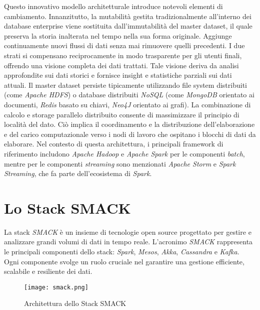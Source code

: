 Questo innovativo modello architetturale introduce notevoli elementi di cambiamento.
Innanzitutto, la mutabilità gestita tradizionalmente all'interno dei database enterprise viene sostituita dall'immutabilità del master dataset, il quale preserva la storia inalterata nel tempo nella sua forma originale.
Aggiunge continuamente nuovi flussi di dati senza mai rimuovere quelli precedenti.
I due strati si compensano reciprocamente in modo trasparente per gli utenti finali, offrendo una visione completa dei dati trattati.
Tale visione deriva da analisi approfondite sui dati storici e fornisce insight e statistiche parziali sui dati attuali.
Il master dataset persiste tipicamente utilizzando file system distribuiti (come \textit{Apache HDFS}) o database distribuiti \textit{NoSQL} (come \textit{MongoDB} orientato ai documenti, \textit{Redis} basato su chiavi, \textit{Neo4J} orientato ai grafi).
La combinazione di calcolo e storage parallelo distribuito consente di massimizzare il principio di località del dato.
Ciò implica il coordinamento e la distribuzione dell'elaborazione e del carico computazionale verso i nodi di lavoro che ospitano i blocchi di dati da elaborare.
Nel contesto di questa architettura, i principali framework di riferimento includono \textit{Apache Hadoop} \cite{hadoop} e \textit{Apache Spark} \cite{spark} per le componenti \textit{batch}, mentre per le componenti \textit{streaming} sono menzionati \textit{Apache Storm} e \textit{Spark Streaming}, che fa parte dell'ecosistema di \textit{Spark}.

\section[Stack SMACK]{Lo Stack SMACK}
La stack \textit{SMACK} è un insieme di tecnologie open source progettato per gestire e analizzare grandi volumi di dati in tempo reale.
L'acronimo \textit{SMACK} rappresenta le principali componenti dello stack: \textit{Spark}, \textit{Mesos}, \textit{Akka}, \textit{Cassandra} e \textit{Kafka}.
Ogni componente svolge un ruolo cruciale nel garantire una gestione efficiente, scalabile e resiliente dei dati.

\begin{figure}[H]
    \centering
    \texttt{[image: smack.png]}
    \caption[Stack SMACK]{Architettura dello Stack SMACK \cite{smack}}
\end{figure}

